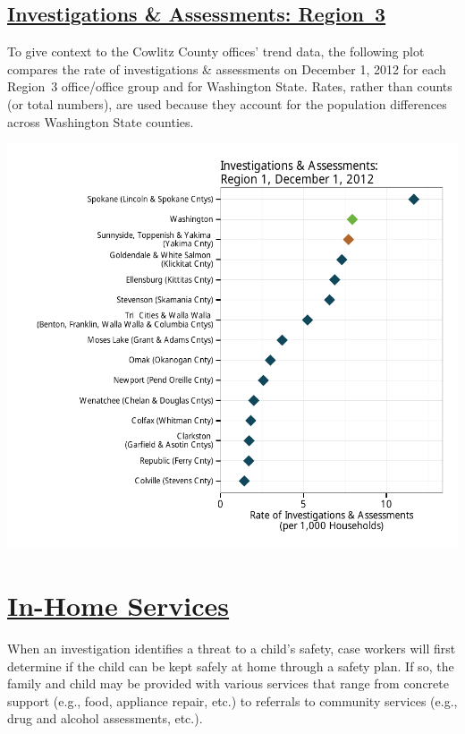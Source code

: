 \documentclass{article}\usepackage[]{graphicx}\usepackage[]{color}
\makeatletter
\def\maxwidth{ %
  \ifdim\Gin@nat@width>\linewidth
    \linewidth
  \else
    \Gin@nat@width
  \fi
}
\newenvironment{knitrout}{}{} %
\makeatother
\begin{document}
\subsection{
    \href{http://www.partnersforourchildren.org//child-well-being/visualizations/investigations-assessments/trends}
    {Investigations \& Assessments: Region~3}}
To give context to the Cowlitz County offices' trend data, the following plot compares the rate of investigations \& assessments on December 1, 2012 for each Region~3 office/office group and for Washington State.  Rates, rather than counts (or total numbers), are used because they account for the population differences across Washington State counties.
\nopagebreak[3]
\begin{knitrout}
\color{fgcolor}

{\centering \includegraphics[width=\maxwidth]{figure/ia_context} 

}



\end{knitrout}



\newpage
\section{\href{http://www.partnersforourchildren.org/child-well-being/visualizations/home-services/trends}
    {In-Home Services}
}
When an investigation identifies a threat to a child's safety, case workers will first determine if the child can be kept safely at home through a safety plan. If so, the family and child may be provided with various services that range from concrete support (e.g., food, appliance repair, etc.) to referrals to community services (e.g., drug and alcohol assessments, etc.).\\[6pt]
\label{p:ihs}
\end{document}
